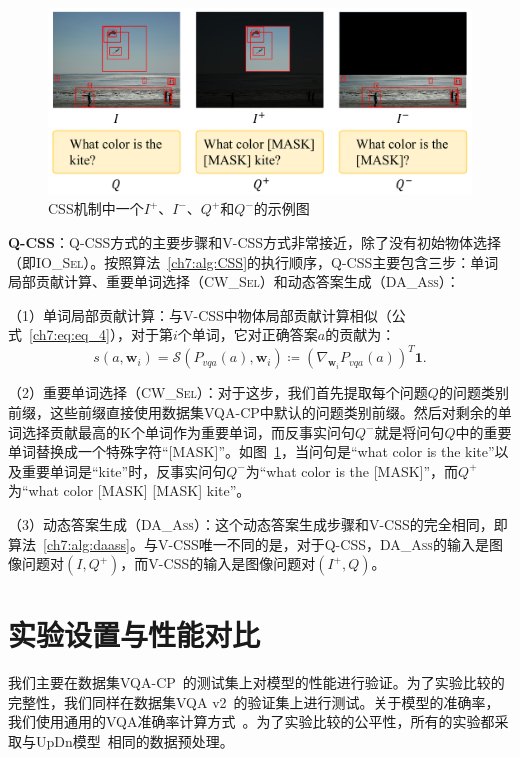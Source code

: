 \begin{figure}[t]
    \centering
        \includegraphics[width=0.9\linewidth]{chapter7/res/IQ+-.pdf}
    \caption{CSS机制中一个$I^+$、$I^-$、$Q^+$和$Q^-$的示例图}
    \label{ch7:fig:IQ+-}
\end{figure}

\textbf{Q-CSS}：Q-CSS方式的主要步骤和V-CSS方式非常接近，除了没有初始物体选择（即\textsc{IO\_Sel}）。按照算法~\ref{ch7:alg:CSS}的执行顺序，Q-CSS主要包含三步：单词局部贡献计算、重要单词选择（\textsc{CW\_Sel}）和动态答案生成（\textsc{DA\_Ass}）：

（1）单词局部贡献计算：与V-CSS中物体局部贡献计算相似（公式~\eqref{ch7:eq:eq_4}），对于第$i$个单词，它对正确答案$a$的贡献为：
\begin{equation} \label{ch7:eq:eq_6}
s(a, \bm{w}_i) = \mathcal{S}(P_{vqa}(a), \bm{w}_i) \coloneqq (\nabla_{\bm{w}_i} P_{vqa}(a))^T\mathbf{1}.
\end{equation}

（2）重要单词选择（\textsc{CW\_Sel}）：对于这步，我们首先提取每个问题$Q$的问题类别前缀，这些前缀直接使用数据集VQA-CP中默认的问题类别前缀。然后对剩余的单词选择贡献最高的K个单词作为重要单词，而反事实问句$Q^-$就是将问句$Q$中的重要单词替换成一个特殊字符“[MASK]”。如图~\ref{ch7:fig:IQ+-}，当问句是“what color is the kite”以及重要单词是“kite”时，反事实问句$Q^-$为“what color is the [MASK]”，而$Q^+$为“what color [MASK] [MASK] kite”。

（3）动态答案生成（\textsc{DA\_Ass}）：这个动态答案生成步骤和V-CSS的完全相同，即算法~\ref{ch7:alg:daass}。与V-CSS唯一不同的是，对于Q-CSS，\textsc{DA\_Ass}的输入是图像问题对$(I, Q^+)$，而V-CSS的输入是图像问题对$(I^+, Q)$。


\section{实验设置与性能对比}

我们主要在数据集VQA-CP~\cite{agrawal2018don}的测试集上对模型的性能进行验证。为了实验比较的完整性，我们同样在数据集VQA v2~\cite{goyal2017making}的验证集上进行测试。关于模型的准确率，我们使用通用的VQA准确率计算方式~\cite{antol2015vqa}。为了实验比较的公平性，所有的实验都采取与UpDn模型~\cite{anderson2018bottom}相同的数据预处理。

